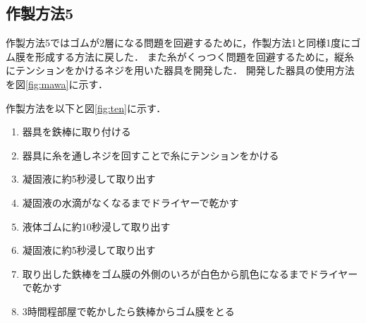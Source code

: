 \subsection{作製方法5}
作製方法5ではゴムが2層になる問題を回避するために，作製方法1と同様1度にゴム膜を形成する方法に戻した．
また糸がくっつく問題を回避するために，縦糸にテンションをかけるネジを用いた器具を開発した．
開発した器具の使用方法を図\ref{fig:mawa}に示す．

作製方法を以下と図\ref{fig:ten}に示す．
\begin{enumerate}
  \item 器具を鉄棒に取り付ける
  \item 器具に糸を通しネジを回すことで糸にテンションをかける
  \item 凝固液に約5秒浸して取り出す
  \item 凝固液の水滴がなくなるまでドライヤーで乾かす
  \item 液体ゴムに約10秒浸して取り出す
  \item 凝固液に約5秒浸して取り出す
  \item 取り出した鉄棒をゴム膜の外側のいろが白色から肌色になるまでドライヤーで乾かす
　\item 3時間程部屋で乾かしたら鉄棒からゴム膜をとる
\end{enumerate}

